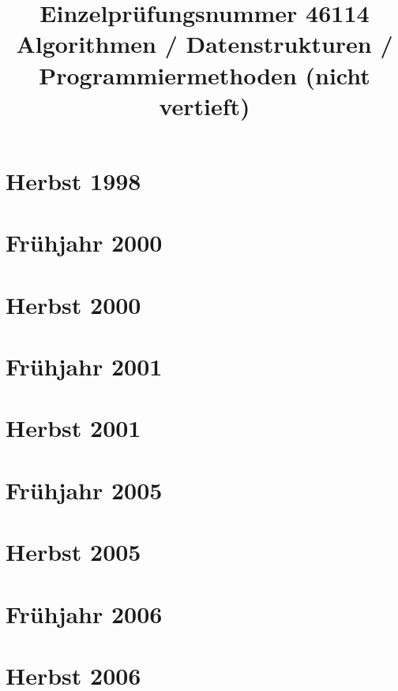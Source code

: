 \documentclass{lehramt-informatik-examen-sammlung}
\title{Einzelprüfungsnummer 46114\\Algorithmen / Datenstrukturen / Programmiermethoden (nicht vertieft)}
\begin{document}
\maketitle
\tableofcontents

\section{Herbst 1998}


\section{Frühjahr 2000}


\section{Herbst 2000}


\section{Frühjahr 2001}


\section{Herbst 2001}


\section{Frühjahr 2005}


\section{Herbst 2005}


\section{Frühjahr 2006}


\section{Herbst 2006}

\end{document}
